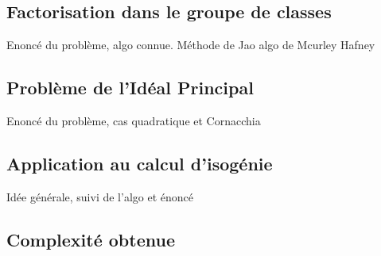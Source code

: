 \documentclass{article}
\begin{document}
\subsection{Factorisation dans le groupe de classes}
Enoncé du problème, algo connue. Méthode de Jao
algo de Mcurley Hafney

\subsection{Problème de l'Idéal Principal}
Enoncé du problème, cas quadratique et Cornacchia

\subsection{Application au calcul d'isogénie}
Idée générale, suivi de l'algo et énoncé

\subsection{Complexité obtenue}

\printbibliography
\end{document}
